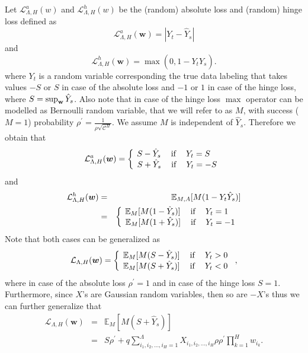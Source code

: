 \documentclass[twoside]{article}
\begin{document}
Let $\mathcal{L}^a_{\Lambda,H}(w)$ and $\mathcal{L}^h_{\Lambda,H}(w)$ be the (random) absolute loss and (random) hinge loss defined as
\[\mathcal{L}^a_{\Lambda,H}({\bm w}) = |Y_t - \hat{Y}_s|
\]
and
\[\mathcal{L}^h_{\Lambda,H}({\bm w}) = \max(0,1-Y_t\hat{Y}_s).
\]
where $Y_t$ is a random variable corresponding the true data labeling that takes values $-S$ or $S$ in case of the absolute loss and $-1$ or $1$ in case of the hinge loss, where $S = \sup_{\bf{w}}{\hat{Y}_s}$. Also note that in case of the hinge loss $\max$ operator can be modelled as Bernoulli random variable, that we will refer to as $M$, with success ($M = 1$) probability $\rho^{'} = \frac{1}{\rho\sqrt{\mathcal{C}^H}}$. We assume $M$ is independent of $\hat{Y}_s$. Therefore we obtain that
\[\mathcal{L}^a_{\Lambda,H}({\bm w}) = \left \{
  \begin{tabular}{c}
  $\!\!\!\!\!\!S - \hat{Y}_s$ $\:\:\:\:$if$\:\:\:\:$ $Y_t = S$ \\
  $\!S + \hat{Y}_s$ $\:\:\:\:$if$\:\:\:\:$ $Y_t = -S$ \\
  \end{tabular}
\right.
\]
and
\begin{eqnarray*}
\mathcal{L}^h_{\Lambda,H}({\bm w}) &=& \mathbb{E}_{M,A}[M(
1-Y_t\hat{Y}_s)]\\&=& \left \{
  \begin{tabular}{c}
  $\!\!\!\!\!\!\mathbb{E}_{M}[M(1 - \hat{Y}_s)]$ $\:\:\:\:$if$\:\:\:\:$ $Y_t = 1$ \\
  $\!\mathbb{E}_{M}[M(1 + \hat{Y}_s)]$ $\:\:\:\:$if$\:\:\:\:$ $Y_t = -1$ \\
  \end{tabular}
\right.
\end{eqnarray*}
Note that both cases can be generalized as
\[\mathcal{L}_{\Lambda,H}({\bm w}) = \left \{
  \begin{tabular}{c}
  $\!\mathbb{E}_{M}[M(S - \hat{Y}_s)]$ $\:\:\:\:$if$\:\:\:\:$ $Y_t  > 0$ \\
  $\!\mathbb{E}_{M}[M(S + \hat{Y}_s)]$ $\:\:\:\:$if$\:\:\:\:$ $Y_t < 0$ \\
  \end{tabular}
\right.,
\]
where in case of the absolute loss $\rho^{'} = 1$ and in case of the hinge loss $S = 1$. Furthermore, since $X$'s are Gaussian random variables, then so are $-X$'s thus we can further generalize that
\begin{eqnarray*}
\mathcal{L}_{\Lambda,H}({\bm w}) \!\!\!\!\!&=&\!\!\!\!\! \mathbb{E}_{M}[M(S + \hat{Y}_s)]\\
&=& \!\!\!\!\!S\rho^{'} \!+\! q\sum_{i_1,i_2,\dots,i_H=1}^{\Lambda}\!\!\!\!\!\!\!X_{i_1,i_2,\dots,i_H}\rho\rho^{'}\prod_{k = 1}^{H}w_{i_k}.
\end{eqnarray*}
\end{document}
